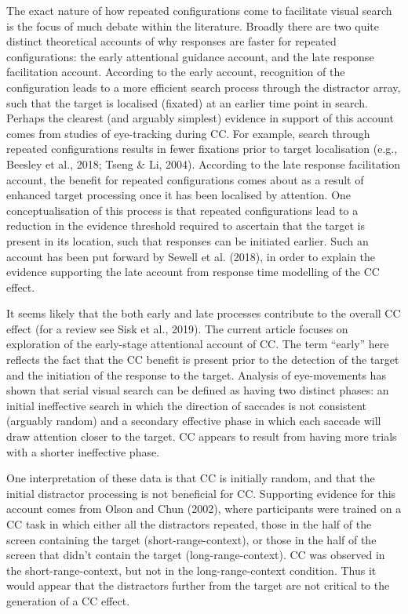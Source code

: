 \documentclass[
  man,
  floatsintext,
  longtable,
  nolmodern,
  notxfonts,
  notimes,
  colorlinks=true,linkcolor=blue,citecolor=blue,urlcolor=blue]{apa7}
\begin{document}
The exact nature of how repeated configurations come to facilitate
visual search is the focus of much debate within the literature. Broadly
there are two quite distinct theoretical accounts of why responses are
faster for repeated configurations: the early attentional guidance
account, and the late response facilitation account. According to the
early account, recognition of the configuration leads to a more
efficient search process through the distractor array, such that the
target is localised (fixated) at an earlier time point in search.
Perhaps the clearest (and arguably simplest) evidence in support of this
account comes from studies of eye-tracking during CC. For example,
search through repeated configurations results in fewer fixations prior
to target localisation (e.g., Beesley et al., 2018; Tseng \& Li, 2004).
According to the late response facilitation account, the benefit for
repeated configurations comes about as a result of enhanced target
processing once it has been localised by attention. One
conceptualisation of this process is that repeated configurations lead
to a reduction in the evidence threshold required to ascertain that the
target is present in its location, such that responses can be initiated
earlier. Such an account has been put forward by Sewell et al. (2018),
in order to explain the evidence supporting the late account from
response time modelling of the CC effect.

It seems likely that the both early and late processes contribute to the
overall CC effect (for a review see Sisk et al., 2019). The current
article focuses on exploration of the early-stage attentional account of
CC. The term ``early'' here reflects the fact that the CC benefit is
present prior to the detection of the target and the initiation of the
response to the target. Analysis of eye-movements has shown that serial
visual search can be defined as having two distinct phases: an initial
ineffective search in which the direction of saccades is not consistent
(arguably random) and a secondary effective phase in which each saccade
will draw attention closer to the target. CC appears to result from
having more trials with a shorter ineffective phase.

One interpretation of these data is that CC is initially random, and
that the initial distractor processing is not beneficial for CC.
Supporting evidence for this account comes from Olson and Chun (2002),
where participants were trained on a CC task in which either all the
distractors repeated, those in the half of the screen containing the
target (short-range-context), or those in the half of the screen that
didn't contain the target (long-range-context). CC was observed in the
short-range-context, but not in the long-range-context condition. Thus
it would appear that the distractors further from the target are not
critical to the generation of a CC effect.
\end{document}
